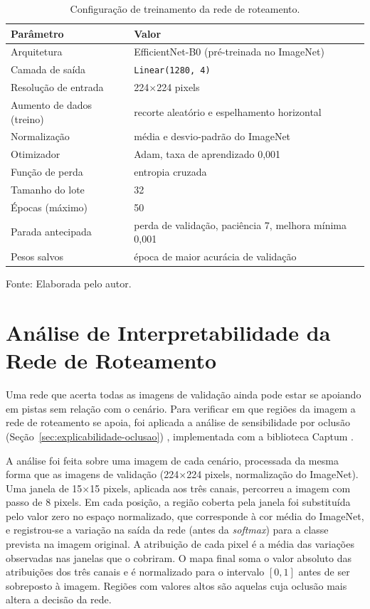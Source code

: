 \begin{table}[htb]
\centering
\caption{Configuração de treinamento da rede de roteamento.}
\label{tab:hiperparametros-roteamento}
\begin{tabular}{ll}
\hline
\textbf{Parâmetro} & \textbf{Valor} \\
\hline
Arquitetura & EfficientNet-B0 (pré-treinada no ImageNet) \\
Camada de saída & \texttt{Linear(1280, 4)} \\
Resolução de entrada & 224$\times$224 pixels \\
Aumento de dados (treino) & recorte aleatório e espelhamento horizontal \\
Normalização & média e desvio-padrão do ImageNet \\
Otimizador & Adam, taxa de aprendizado 0,001 \\
Função de perda & entropia cruzada \\
Tamanho do lote & 32 \\
Épocas (máximo) & 50 \\
Parada antecipada & perda de validação, paciência 7, melhora mínima 0,001 \\
Pesos salvos & época de maior acurácia de validação \\
\hline
\end{tabular}

\vspace{0.2cm}
Fonte: Elaborada pelo autor.
\end{table}

\section{Análise de Interpretabilidade da Rede de Roteamento}
\label{sec:metodo-oclusao}

Uma rede que acerta todas as imagens de validação ainda pode estar se apoiando em pistas sem relação com o cenário. Para verificar em que regiões da imagem a rede de roteamento se apoia, foi aplicada a análise de sensibilidade por oclusão (Seção~\ref{sec:explicabilidade-oclusao}) \cite{zeiler2014visualizing}, implementada com a biblioteca Captum \cite{kokhlikyan2020captum}.

A análise foi feita sobre uma imagem de cada cenário, processada da mesma forma que as imagens de validação (224$\times$224 pixels, normalização do ImageNet). Uma janela de 15$\times$15 pixels, aplicada aos três canais, percorreu a imagem com passo de 8 pixels. Em cada posição, a região coberta pela janela foi substituída pelo valor zero no espaço normalizado, que corresponde à cor média do ImageNet, e registrou-se a variação na saída da rede (antes da \textit{softmax}) para a classe prevista na imagem original. A atribuição de cada pixel é a média das variações observadas nas janelas que o cobriram. O mapa final soma o valor absoluto das atribuições dos três canais e é normalizado para o intervalo $[0, 1]$ antes de ser sobreposto à imagem. Regiões com valores altos são aquelas cuja oclusão mais altera a decisão da rede.


